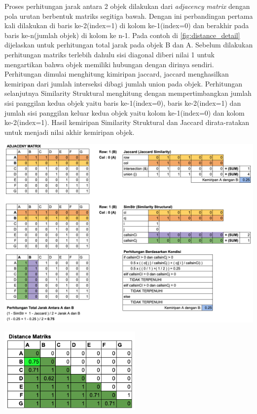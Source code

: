 Proses perhitungan jarak antara 2 objek dilakukan dari \textit{adjacency} \textit{matrix} dengan pola urutan berbentuk matriks segitiga bawah. Dengan ini perbandingan pertama kali dilakukan di baris ke-2(index=1) di kolom ke-1(index=0) dan berakhir pada baris ke-n(jumlah objek) di kolom  ke n-1. Pada contoh di \ref{fig:distance_detail} dijelaskan untuk perhitungan total jarak pada objek B dan A. Sebelum dilakukan perhitungan matriks terlebih dahulu sisi diagonal diberi nilai 1 untuk mengartikan bahwa objek memiliki hubungan dengan dirinya sendiri.  Perhitungan dimulai menghitung kimiripan jaccard, jaccard menghasilkan kemiripan dari jumlah interseksi dibagi jumlah union pada objek. Perhitungan selanjutnya Similarity Struktural menghitung dengan mempertimbangkan jumlah sisi panggilan kedua objek yaitu baris ke-1(index=0), baris ke-2(index=1) dan jumlah sisi panggilan keluar kedua objek yaitu kolom  ke-1(index=0) dan kolom ke-2(index=1). Hasil kemiripan Similarity Struktural dan Jaccard dirata-ratakan untuk menjadi nilai akhir kemiripan objek.

\begin{center}
	\includegraphics[width=14cm]{img/bab_3/distance_detail.png}
	\label{fig:distance_detail}
\end{center}

\begin{center}
	\includegraphics[width=7cm]{img/bab_3/distance_final.png}
	\label{fig:asd}
\end{center}

